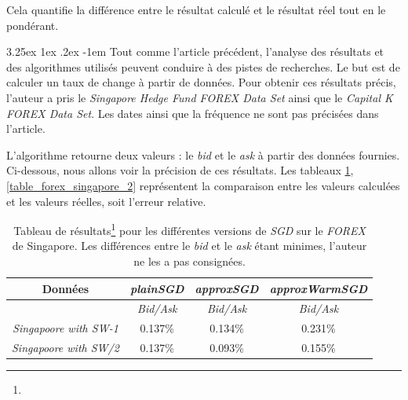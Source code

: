 \documentclass[a4paper, 11pt]{article}
\makeatletter
\newcounter{subsubsubsection}[subsubsection]
\renewcommand\paragraph{\@startsection{paragraph}{5}{\z@}%
  {3.25ex \@plus1ex \@minus.2ex}%
  {-1em}%
  {\normalfont\normalsize\bfseries}}
\makeatother
\begin{document}
Cela quantifie la différence entre le résultat calculé et le résultat réel tout en le pondérant.

\paragraph{}
Tout comme l'article précédent, l'analyse des résultats et des algorithmes utilisés peuvent conduire à des pistes de recherches.
Le but est de calculer un taux de change à partir de données. Pour obtenir ces résultats précis, l'auteur a pris le
\textit{Singapore Hedge Fund FOREX Data Set} ainsi que le \textit{Capital K FOREX Data Set}. Les dates ainsi que la fréquence
ne sont pas précisées dans l'article.

L'algorithme retourne deux valeurs : le \textit{bid} et le \textit{ask} à partir des données fournies. Ci-dessous, nous allons
voir la précision de ces résultats. Les tableaux \ref{table_forex_singapore}, \ref{table_forex_singapore_2} représentent la
comparaison entre les valeurs calculées et les valeurs réelles, soit l'erreur relative.

\begin{table}[H]
	\centering
\begin{tabular}{|c|c|c|c|}
	\hline
	Données & \textit{plainSGD} & \textit{approxSGD} & \textit{approxWarmSGD}\\
	\hline
	\ & \textit{Bid/Ask} & \textit{Bid/Ask} & \textit{Bid/Ask} \\
	\hline
	\textit{Singapoore with SW-1\footnotemark{}} & 0.137\% & 0.134\% & 0.231\% \\
	\hline
	\textit{Singapoore with SW/2\footnotemark{}} & 0.137\% & 0.093\% & 0.155\%\\
	\hline

\end{tabular}
\label{table_forex_singapore}
\caption[]{Tableau de résultats\footnote[3]{} pour les différentes versions de \textit{SGD} sur le
\textit{FOREX} de Singapore. Les différences entre le \textit{bid} et le \textit{ask} étant minimes,
l'auteur ne les a pas consignées.}
\end{table}

 \addtocounter{footnote}{-2} %
\end{document}
